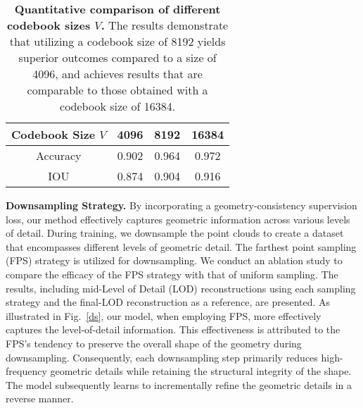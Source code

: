 \begin{table}
    \centering
    \begin{tabular}{c|ccc}
        \hline
         Codebook Size $V$ & 4096 & 8192 &16384 \\
         \hline
         Accuracy &  0.902  &    0.964     &  0.972   \\
         IOU & 0.874 & 0.904  & 0.916 \\ 
         \hline
    \end{tabular}
    \caption{\textbf{Quantitative comparison of different codebook sizes $V$.} The results demonstrate that utilizing a codebook size of 8192 yields superior outcomes compared to a size of 4096, and achieves results that are comparable to those obtained with a codebook size of 16384.}
    \label{tab:codebook}
\end{table}

\noindent\textbf{Downsampling Strategy.}
By incorporating a geometry-consistency supervision loss, our method effectively captures geometric information across various levels of detail. During training, we downsample the point clouds to create a dataset that encompasses different levels of geometric detail. The farthest point sampling (FPS) strategy is utilized for downsampling. We conduct an ablation study to compare the efficacy of the FPS strategy with that of uniform sampling. The results, including mid-Level of Detail (LOD) reconstructions using each sampling strategy and the final-LOD reconstruction as a reference, are presented. As illustrated in Fig.~\ref{ds}, our model, when employing FPS, more effectively captures the level-of-detail information. This effectiveness is attributed to the FPS's tendency to preserve the overall shape of the geometry during downsampling. Consequently, each downsampling step primarily reduces high-frequency geometric details while retaining the structural integrity of the shape. The model subsequently learns to incrementally refine the geometric details in a reverse manner.

